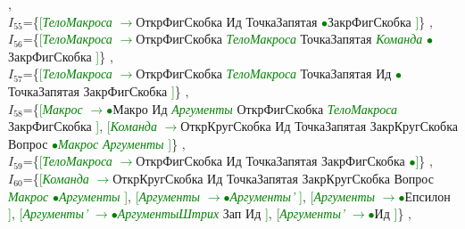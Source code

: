 \documentclass[a0]{a0poster}
\begin{document}
,\\
$I_{55}$=\{\textcolor{Green}{[}\textcolor{Green}{\textit{ТелоМакроса}} \textcolor{Green}{$\to$}ОткрФигСкобка Ид ТочкаЗапятая \textcolor{Green}{$\bullet$}ЗакрФигСкобка \textcolor{Green}{]}\}
,\\
$I_{56}$=\{\textcolor{Green}{[}\textcolor{Green}{\textit{ТелоМакроса}} \textcolor{Green}{$\to$}ОткрФигСкобка \textcolor{Green}{\textit{ТелоМакроса}} ТочкаЗапятая \textcolor{Green}{\textit{Команда}} \textcolor{Green}{$\bullet$}ЗакрФигСкобка \textcolor{Green}{]}\}
,\\
$I_{57}$=\{\textcolor{Green}{[}\textcolor{Green}{\textit{ТелоМакроса}} \textcolor{Green}{$\to$}ОткрФигСкобка \textcolor{Green}{\textit{ТелоМакроса}} ТочкаЗапятая Ид \textcolor{Green}{$\bullet$}ТочкаЗапятая ЗакрФигСкобка \textcolor{Green}{]}\}
,\\
$I_{58}$=\{\textcolor{Green}{[}\textcolor{Green}{\textit{Макрос}} \textcolor{Green}{$\to$}\textcolor{Green}{$\bullet$}Макро Ид \textcolor{Green}{\textit{Аргументы}} ОткрФигСкобка \textcolor{Green}{\textit{ТелоМакроса}} ЗакрФигСкобка \textcolor{Green}{]}, \textcolor{Green}{[}\textcolor{Green}{\textit{Команда}} \textcolor{Green}{$\to$}ОткрКругСкобка Ид ТочкаЗапятая ЗакрКругСкобка Вопрос \textcolor{Green}{$\bullet$}\textcolor{Green}{\textit{Макрос}} \textcolor{Green}{\textit{Аргументы}} \textcolor{Green}{]}\}
,\\
$I_{59}$=\{\textcolor{Green}{[}\textcolor{Green}{\textit{ТелоМакроса}} \textcolor{Green}{$\to$}ОткрФигСкобка Ид ТочкаЗапятая ЗакрФигСкобка \textcolor{Green}{$\bullet$}\textcolor{Green}{]}\}
,\\
$I_{60}$=\{\textcolor{Green}{[}\textcolor{Green}{\textit{Команда}} \textcolor{Green}{$\to$}ОткрКругСкобка Ид ТочкаЗапятая ЗакрКругСкобка Вопрос \textcolor{Green}{\textit{Макрос}} \textcolor{Green}{$\bullet$}\textcolor{Green}{\textit{Аргументы}} \textcolor{Green}{]}, \textcolor{Green}{[}\textcolor{Green}{\textit{Аргументы}} \textcolor{Green}{$\to$}\textcolor{Green}{$\bullet$}\textcolor{Green}{\textit{Аргументы'}} \textcolor{Green}{]}, \textcolor{Green}{[}\textcolor{Green}{\textit{Аргументы}} \textcolor{Green}{$\to$}\textcolor{Green}{$\bullet$}Епсилон \textcolor{Green}{]}, \textcolor{Green}{[}\textcolor{Green}{\textit{Аргументы'}} \textcolor{Green}{$\to$}\textcolor{Green}{$\bullet$}\textcolor{Green}{\textit{АргументыШтрих}} Зап Ид \textcolor{Green}{]}, \textcolor{Green}{[}\textcolor{Green}{\textit{Аргументы'}} \textcolor{Green}{$\to$}\textcolor{Green}{$\bullet$}Ид \textcolor{Green}{]}\}
,\\
\end{document}
